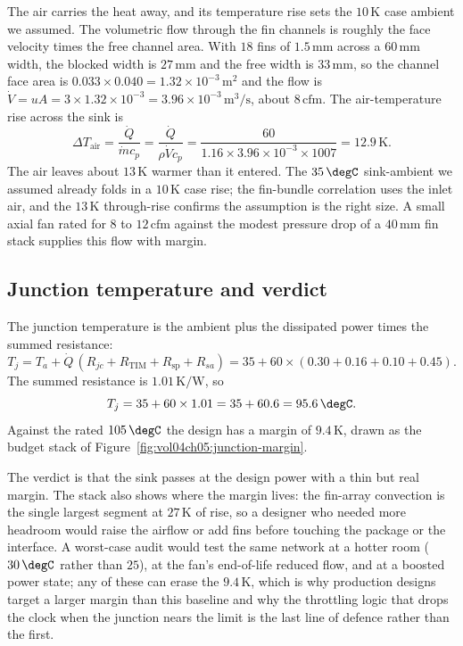 The air carries the heat away, and its temperature rise sets the
$10\,\si{\kelvin}$ case ambient we assumed. The volumetric flow through
the fin channels is roughly the face velocity times the free channel
area. With $18$ fins of $1.5\,\si{\milli\meter}$ across a $60\,\si{
\milli\meter}$ width, the blocked width is $27\,\si{\milli\meter}$ and
the free width is $33\,\si{\milli\meter}$, so the channel face area is
$0.033 \times 0.040 = 1.32 \times 10^{-3}\,\text{m}^2$ and the flow is
$\dot{V} = u A = 3 \times 1.32 \times 10^{-3} = 3.96 \times 10^{-3}\,
\text{m}^3/\text{s}$, about $8\,\text{cfm}$. The air-temperature rise
across the sink is
\[
\Delta T_{\text{air}} = \frac{\dot{Q}}{\dot{m} c_p} = \frac{\dot{Q}}{
\rho \dot{V} c_p} = \frac{60}{1.16 \times 3.96 \times 10^{-3} \times
1007} = 12.9\,\si{\kelvin}.
\]
The air leaves about $13\,\si{\kelvin}$ warmer than it entered. The
$35\,\degC$ sink-ambient we assumed already folds in a $10\,\si{\kelvin}$
case rise; the fin-bundle correlation uses the inlet air, and the
$13\,\si{\kelvin}$ through-rise confirms the assumption is the right
size. A small axial fan rated for $8$ to $12\,\text{cfm}$ against the
modest pressure drop of a $40\,\si{\milli\meter}$ fin stack supplies
this flow with margin.

\subsection{Junction temperature and verdict}

The junction temperature is the ambient plus the dissipated power times
the summed resistance:
\[
T_j = T_a + \dot{Q}\,(R_{jc} + R_{\text{TIM}} + R_{\text{sp}} + R_{sa})
= 35 + 60 \times (0.30 + 0.16 + 0.10 + 0.45).
\]
The summed resistance is $1.01\,\si{\kelvin}/\text{W}$, so
\[
T_j = 35 + 60 \times 1.01 = 35 + 60.6 = 95.6\,\degC.
\]
Against the rated $105\,\degC$ the design has a margin of $9.4\,\si{
\kelvin}$, drawn as the budget stack of
Figure~\ref{fig:vol04ch05:junction-margin}.



The verdict is that the
sink passes at the design power with a thin but real margin. The stack
also shows where the margin lives: the fin-array convection is the
single largest segment at $27\,\si{\kelvin}$ of rise, so a designer who
needed more headroom would raise the airflow or add fins before touching
the package or the interface. A worst-case audit would test the same
network at a hotter room ($30\,\degC$ rather than $25$), at the fan's
end-of-life reduced flow, and at a boosted power state; any of these can
erase the $9.4\,\si{\kelvin}$, which is why production designs target a
larger margin than this baseline and why the throttling logic that drops
the clock when the junction nears the limit is the last line of defence
rather than the first.

